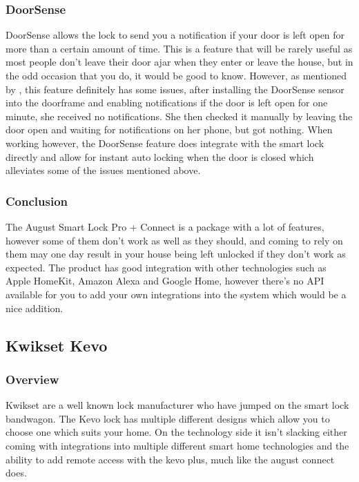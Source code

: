 \subsubsection*{DoorSense}
DoorSense allows the lock to send you a notification if your door is left open for more than a certain amount of time. This is a feature that will be rarely useful as most people don't leave their door ajar when they enter or leave the house, but in the odd occasion that you do, it would be good to know. However, as mentioned by \cite{So2017}, this feature definitely has some issues, after installing the DoorSense sensor into the doorframe and enabling notifications if the door is left open for one minute, she received no notifications. She then checked it manually by leaving the door open and waiting for notifications on her phone, but got nothing. When working however, the DoorSense feature does integrate with the smart lock directly and allow for instant auto locking when the door is closed which alleviates some of the issues mentioned above.

\subsubsection*{Conclusion}
The August Smart Lock Pro + Connect is a package with a lot of features, however some of them don't work as well as they should, and coming to rely on them may one day result in your house being left unlocked if they don't work as expected. The product has good integration with other technologies such as Apple HomeKit, Amazon Alexa and Google Home, however there's no API available for you to add your own integrations into the system which would be a nice addition.

\subsection{Kwikset Kevo}
\subsubsection*{Overview}
Kwikset are a well known lock manufacturer who have jumped on the smart lock bandwagon. The Kevo lock has multiple different designs which allow you to choose one which suits your home. On the technology side it isn't slacking either coming with integrations into multiple different smart home technologies and the ability to add remote access with the kevo plus, much like the august connect does.

